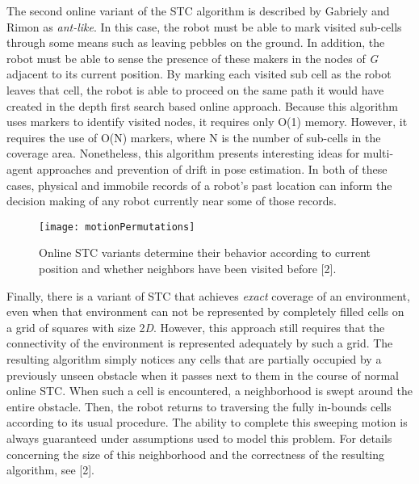 The second online variant of the STC algorithm is described by Gabriely and Rimon as \textit{ant-like}. In this case, the robot must be able to mark visited sub-cells through some means such as leaving pebbles on the ground. In addition, the robot must be able to sense the presence of these makers in the nodes of \textit{G} adjacent to its current position. By marking each visited sub cell as the robot leaves that cell, the robot is able to proceed on the same path it would have created in the depth first search based online approach. Because this algorithm uses markers to identify visited nodes, it requires only O(1) memory. However, it requires the use of O(N) markers, where N is the number of sub-cells in the coverage area. Nonetheless, this algorithm presents interesting ideas for multi-agent approaches and prevention of drift in pose estimation. In both of these cases, physical and immobile records of a robot's past location can inform the decision making of any robot currently near some of those records.

\begin{figure}[H]
\texttt{[image: motionPermutations]}
\caption[Neighbor Visiting Behavior for Online STC]{Online STC variants determine their behavior according to current position and whether neighbors have been visited before [2].}
\end{figure}

Finally, there is a variant of STC that achieves \textit{exact} coverage of an environment, even when that environment can not be represented by completely filled cells on a grid of squares with size 2\textit{D}. However, this approach still requires that the connectivity of the environment is represented adequately by such a grid. The resulting algorithm simply notices any cells that are partially occupied by a previously unseen obstacle when it passes next to them in the course of normal online STC. When such a cell is encountered, a neighborhood is swept around the entire obstacle. Then, the robot returns to traversing the fully in-bounds cells according to its usual procedure. The ability to complete this sweeping motion is always guaranteed under assumptions used to model this problem. For details concerning the size of this neighborhood and the correctness of the resulting algorithm, see [2].

